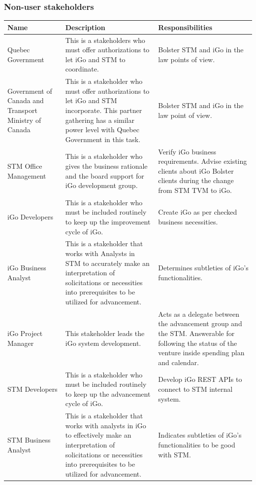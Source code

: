\documentclass[11pt, english]{report}
\begin{document}
\subsubsection{Non-user stakeholders}
\vspace*{0.1in}
\setlength{\tabcolsep}{18pt}
\renewcommand{\arraystretch}{1.5}
\begin{longtable}[!htbp]{ |p{3cm}|p{7cm}|p{3cm}| }

\hline
Name & Description & Responsibilities\\
\hline

Quebec Government &
This is a stakeholders who must offer authorizations to let iGo and STM to coordinate. &
Bolster STM and iGo in the law points of view.\\
\hline
Government of Canada and Transport Ministry of Canada  &

This is a stakeholder who must offer authorizations to let iGo and STM incorporate. This partner gathering has a similar power level with Quebec Government in this task. &
Bolster STM and iGo in the law point of view.\\
\hline



STM Office Management &
This is a stakeholder who gives the business rationale and the board support for iGo development group. &
Verify iGo business requirements. 
Advise existing clients about iGo 
Bolster clients during the change from STM TVM to iGo.\\
\hline
iGo Developers & 

This is a stakeholder who must be included routinely to keep up the improvement cycle of iGo.&
Create iGo as per checked business necessities.\\
\hline
iGo Business Analyst &
This is a stakeholder that works with Analysts in STM to accurately make an interpretation of solicitations or necessities into prerequisites to be utilized for advancement. &
Determines subtleties of iGo's functionalities.\\
\hline

iGo Project Manager &
This stakeholder leads the iGo system development. &
Acts as a delegate between the advancement group and the STM. Answerable for following the status of the venture inside spending plan and calendar.\\
\hline
STM Developers &
This is a stakeholder who must be included routinely to keep up the advancement cycle of iGo. &
Develop iGo REST APIs to connect to STM internal system. \\
\hline
STM Business Analyst &
This is a stakeholder that works with analysts in iGo to effectively make an interpretation of solicitations or necessities into prerequisites to be utilized for advancement. &
Indicates subtleties of iGo's functionalities to be good with STM.\\





\end{longtable}
\end{document}
